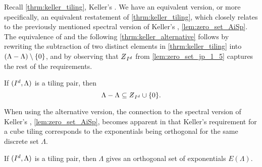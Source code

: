 \documentclass[../thesis.tex]{subfiles}
\begin{document}
  


Recall \cref{thrm:keller_tiling}, Keller's . We have an equivalent version, or more specifically, an equivalent restatement of \cref{thrm:keller_tiling}, which closely relates to the previously mentioned spectral version of Keller's , \cref{lem:zero_set_AiSp}. The equivalence of  and the following \cref{thrm:keller_alternative} follows by rewriting the subtraction of two distinct elements in \cref{thrm:keller_tiling} into $(\Lambda-\Lambda)\setminus\{0\}$, and by observing that $\Zstroke_{I^d}$ from \cref{lem:zero_set_jp_1_5} captures the rest of the requirements.

\begin{theorem}\label{thrm:keller_alternative}
    If $(I^d,\Lambda)$ is a tiling pair, then 
    \begin{equation*}
        \Lambda - \Lambda \subseteq \Zstroke_{I^d} \cup \braq{0}.
    \end{equation*} 
\end{theorem}

When using the alternative version, the connection to the spectral version of Keller's , \cref{lem:zero_set_AiSp}, becomes apparent in that Keller's requirement for a cube tiling corresponds to the exponentials being orthogonal for the same discrete set $\Lambda$.

\begin{corollary}\label{cor:tiling_pair_implies_orthogonal}
    If $(I^d, \Lambda)$ is a tiling pair, then $\Lambda$ gives an orthogonal set of exponentials $E(\Lambda)$.
\end{corollary}
\end{document}
